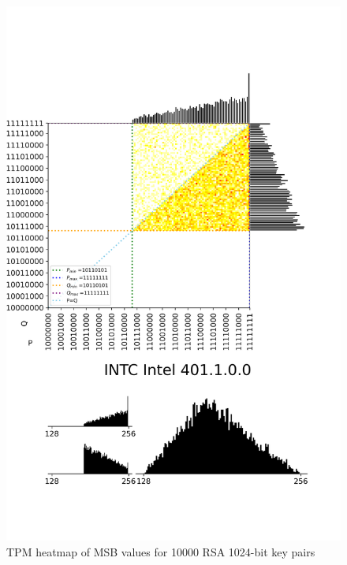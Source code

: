\begin{figure}[H]
    \centering
    \includegraphics[width=\textwidth,height=\textheight-1.5cm, keepaspectratio]{img/visualizations/rsa.png}
    \caption{TPM heatmap of MSB values for 10000 RSA 1024-bit key pairs}
    \label{fig:heatmap-rsa-10000-1024}
\end{figure}


